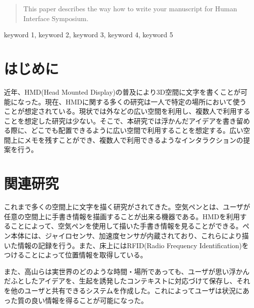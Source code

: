 \documentclass{hissymp}
\begin{document}

\begin{abstract}
This paper describes the way how to write your manuscript for Human Interface Symposium.
\end{abstract}

\begin{keyword}	
keyword 1, keyword 2, keyword 3, keyword 4, keyword 5
\end{keyword}

\maketitle	

\section{はじめに}
近年、HMD(Head Mounted Display)の普及により3D空間に文字を書くことが可能になった。現在、HMDに関する多くの研究は一人で特定の場所において使うことが想定されている。現状では外などの広い空間を利用し、複数人で利用することを想定した研究は少ない。そこで、本研究では浮かんだアイデアを書き留める際に、どこでも配置できるように広い空間で利用することを想定する。広い空間上にメモを残すことができ、複数人で利用できるようなインタラクションの提案を行う。


\section{関連研究}
これまで多くの空間上に文字を描く研究がされてきた。空気ペンとは、ユーザが任意の空間上に手書き情報を描画することが出来る機器である。HMDを利用することによって、空気ペンを使用して描いた手書き情報を見ることができる。ペン本体には、ジャイロセンサ、加速度センサが内蔵されており、これらにより描いた情報の記録を行う。また、床上にはRFID(Radio Frequency Identification)をつけることによって位置情報を取得している。

また、高山らは実世界のどのような時間・場所であっても、ユーザが思い浮かんだふとしたアイデアを、生起を誘発したコンテキストに対応づけて保存し、それを他のユーザと共有できるシステムを作成した。これによってユーザは状況にあった質の良い情報を得ることが可能になった。
\end{document}
